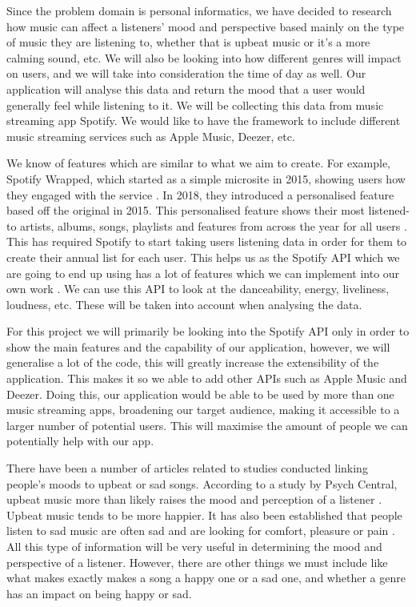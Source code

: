 \documentclass[10pt, notitlepage]{report}
\begin{document}
Since the problem domain is personal informatics, we have decided to research how music can affect a listeners' mood and perspective based mainly on the type of music they are listening to, whether that is upbeat music or it’s a more calming sound, etc. We will also be looking into how different genres will impact on users, and we will take into consideration the time of day as well. Our application will analyse this data and return the mood that a user would generally feel while listening to it. We will be collecting this data from music streaming app Spotify. We would like to have the framework to include different music streaming services such as Apple Music, Deezer, etc.

We know of features which are similar to what we aim to create. For example, Spotify Wrapped, which started as a simple microsite in 2015, showing users how they engaged with the service \cite{Swant}. In 2018, they introduced a personalised feature based off the original in 2015. This personalised feature shows their most listened-to artists, albums, songs, playlists and features from across the year for all users \cite{Somerville}. This has required Spotify to start taking users listening data in order for them to create their annual list for each user. This helps us as the Spotify API which we are going to end up using has a lot of features which we can implement into our own work \cite{WebAPI}. We can use this API to look at the danceability, energy, liveliness, loudness, etc. These will be taken into account when analysing the data.

For this project we will primarily be looking into the Spotify API only in order to show the main features and the capability of our application, however, we will generalise a lot of the code, this will greatly increase the extensibility of the application. This makes it so we able to add other APIs such as Apple Music and Deezer. Doing this, our application would be able to be used by more than one music streaming apps, broadening our target audience, making it accessible to a larger number of potential users. This will maximise the amount of people we can potentially help with our app.

There have been a number of articles related to studies conducted linking people’s moods to upbeat or sad songs. According to a study by Psych Central, upbeat music more than likely raises the mood and perception of a listener \cite{Nauert2018}. Upbeat music tends to be more happier. It has also been established that people listen to sad music are often sad and are looking for comfort, pleasure or pain \cite{Eerola2016}. All this type of information will be very useful in determining the mood and perspective of a listener. However, there are other things we must include like what makes exactly makes a song a happy one or a sad one, and whether a genre has an impact on being happy or sad.
\end{document}
